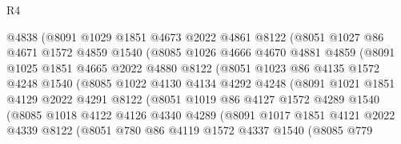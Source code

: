 \begin{lexlean}{R4}
\begin{coremodule}
                @4838
                (@8091
                  @1029
                  @1851
                  @4673
                  @2022
                  @4861
                  @8122
                  (@8051
                    @1027
                    @86
                    @4671
                    @1572
                    @4859
                    @1540
                    (@8085
                      @1026
                      @4666
                      @4670
                      @4881
                      @4859
                      (@8091
                        @1025
                        @1851
                        @4665
                        @2022
                        @4880
                        @8122
                        (@8051
                          @1023
                          @86
                          @4135
                          @1572
                          @4248
                          @1540
                          (@8085
                            @1022
                            @4130
                            @4134
                            @4292
                            @4248
                            (@8091
                              @1021
                              @1851
                              @4129
                              @2022
                              @4291
                              @8122
                              (@8051
                                @1019
                                @86
                                @4127
                                @1572
                                @4289
                                @1540
                                (@8085
                                  @1018
                                  @4122
                                  @4126
                                  @4340
                                  @4289
                                  (@8091
                                    @1017
                                    @1851
                                    @4121
                                    @2022
                                    @4339
                                    @8122
                                    (@8051
                                      @780
                                      @86
                                      @4119
                                      @1572
                                      @4337
                                      @1540
                                      (@8085
                                        @779

\end{coremodule}
\end{lexlean}

